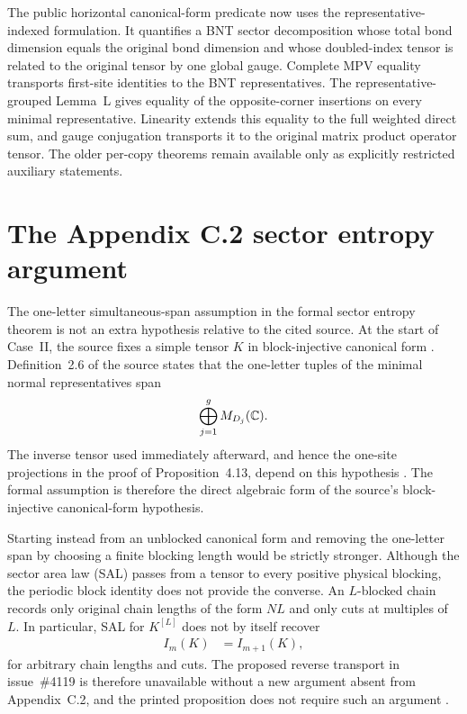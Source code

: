\documentclass{article}
\begin{document}
The public horizontal canonical-form predicate now uses the
representative-indexed formulation. It quantifies a BNT sector decomposition
whose total bond dimension equals the original bond dimension and whose
doubled-index tensor is related to the original tensor by one global gauge.
Complete MPV equality transports first-site identities to the BNT
representatives. The representative-grouped Lemma~L gives equality of the
opposite-corner insertions on every minimal representative. Linearity extends
this equality to the full weighted direct sum, and gauge conjugation transports
it to the original matrix product operator tensor. The older per-copy
 theorems remain available only as explicitly
restricted auxiliary statements.

\section{The Appendix C.2 sector entropy argument}

The one-letter simultaneous-span assumption in the formal sector entropy
theorem is not an extra hypothesis relative to the cited source. At the start
of Case~II, the source fixes a simple tensor $K$ in block-injective canonical
form \cite[line~1628]{Cirac2016MPDO_arXiv}. Definition~2.6 of the source states
that the one-letter tuples of the minimal normal representatives span
\begin{align}
    \bigoplus_{j=1}^{g}M_{D_j}(\mathbb{C}).
    \label{eq:cpgsv17_bicf_block_separation_one_letter_bicf_span}
\end{align}
The inverse tensor used immediately afterward, and hence the one-site
projections in the proof of Proposition~4.13, depend on this hypothesis
\cite{Cirac2016MPDO_arXiv}. The formal assumption
 is therefore the direct algebraic form of
the source's block-injective canonical-form hypothesis.

Starting instead from an unblocked canonical form and removing the one-letter
span by choosing a finite blocking length would be strictly stronger. Although
the sector area law (SAL) passes from a tensor to every positive physical
blocking, the periodic block identity does not provide the converse. An
$L$-blocked chain records only original chain lengths of the form $NL$ and
only cuts at multiples of $L$. In particular, SAL for $K^{[L]}$ does not by
itself recover
\begin{align}
    I_m(K)
        &= I_{m+1}(K),
    \label{eq:cpgsv17_bicf_block_separation_unblocked_entropy_equality}
\end{align}
for arbitrary chain lengths and cuts. The proposed reverse transport in
issue~\#4119 is therefore unavailable without a new argument absent from
Appendix~C.2, and the printed proposition does not require such an argument
\cite{Cirac2016MPDO_arXiv}.
\end{document}
